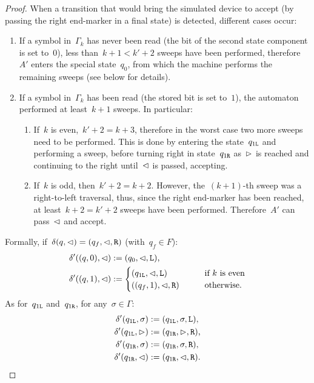 \begin{proof}
	When a transition that would bring the simulated device to accept (by passing the right end-marker in a final state) is detected, different cases occur:
	\begin{enumerate}
		\item If a symbol in~$\Gamma_k$ has never been read (\ie the bit of the second state component is set to~$0$), less than~$k+1<k'+2$ sweeps have been performed, therefore~$A'$ enters the special state~$q_0$, from which the machine performs the remaining sweeps (see below for details).
		\item If a symbol in~$\Gamma_k$ has been read (\ie the stored bit is set to~$1$), the automaton performed at least~$k+1$ sweeps. In particular:
		      \begin{enumerate}
			      \item If~$k$ is even,~$k'+2=k+3$, therefore in the worst case two more sweeps need to be performed.
			            This is done by entering the state~$q_{1\mathtt{L}}$ and performing a sweep, before turning right in state~$q_{1\mathtt{R}}$ as~$\rhd$ is reached and continuing to the right until~$\lhd$ is passed, accepting.
			      \item If~$k$ is odd, then~$k'+2=k+2$. However, the~$(k+1)$-th sweep was a right-to-left traversal, thus, since the right end-marker has been reached, at least~$k+2=k'+2$ sweeps have been performed. Therefore~$A'$ can pass~$\lhd$ and accept.
		      \end{enumerate}
	\end{enumerate}

	Formally, if~$\delta(q,\lhd)=(q_f,\lhd,\mathtt R)$ (with~$q_f\in F$):
	\begin{align*}
		\delta'((q,0),\lhd) & := (q_0,\lhd,\mathtt L) \text,                               \\
		\delta'((q,1),\lhd) & := \begin{cases}
			                         (q_{1\mathtt{L}},\lhd,\mathtt L) \qquad     & \text{if~$k$ is even}   \\
			                         ((q_f,1),\lhd,\mathtt R) \qquad & \text{otherwise} \text.
		                         \end{cases}
	\end{align*}
	As for~$q_{1\mathtt{L}}$ and~$q_{1\mathtt{R}}$, for any~$\sigma\in\Gamma$:
	\begin{align*}
		\delta'(q_{1\mathtt{L}},\sigma) & :=(q_{1\mathtt{L}},\sigma,\mathtt L) \text, \\
		\delta'(q_{1\mathtt{L}},\rhd)   & :=(q_{1\mathtt{R}},\rhd,\mathtt R) \text,   \\
		\delta'(q_{1\mathtt{R}},\sigma) & :=(q_{1\mathtt{R}},\sigma,\mathtt R) \text, \\
		\delta'(q_{1\mathtt{R}},\lhd)   & :=(q_{1\mathtt{R}},\lhd,\mathtt R) \text.
	\end{align*}


\end{proof}
